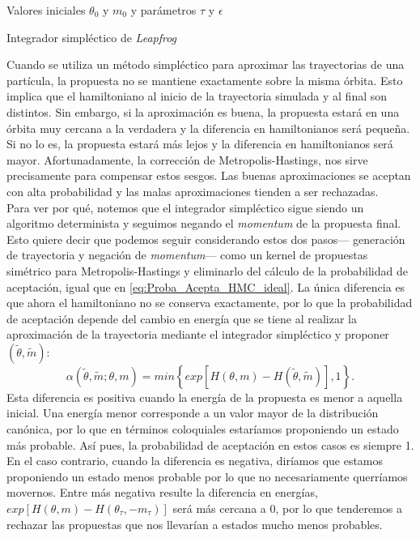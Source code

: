 \begin{algorithm}
\DontPrintSemicolon
Valores iniciales $\theta_0$ y $m_0$ y parámetros $\tau$ y $\epsilon$\;

\caption{Integrador simpléctico de \textit{Leapfrog} \label{alg:Leapfrog}}
\end{algorithm}

Cuando se utiliza un método simpléctico para aproximar las trayectorias de una partícula, la propuesta no se mantiene exactamente sobre la misma órbita. Esto implica que el hamiltoniano al inicio de la trayectoria simulada y al final son distintos. Sin embargo, si la aproximación es buena, la propuesta estará en una órbita muy cercana a la verdadera y la diferencia en hamiltonianos será pequeña. Si no lo es, la propuesta estará más lejos y la diferencia en hamiltonianos será mayor. Afortunadamente, la corrección de Metropolis-Hastings, nos sirve precisamente para compensar estos sesgos. Las buenas aproximaciones se aceptan con alta probabilidad y las malas aproximaciones tienden a ser rechazadas.\\

Para ver por qué, notemos que el integrador simpléctico sigue siendo un algoritmo determinista y seguimos negando el \textit{momentum} de la propuesta final. Esto quiere decir que podemos seguir considerando estos dos pasos--- generación de trayectoria y negación de \textit{momentum}--- como un kernel de propuestas simétrico para Metropolis-Hastings y eliminarlo del cálculo de la probabilidad de aceptación, igual que en \eqref{eq:Proba_Acepta_HMC_ideal}. La única diferencia es que ahora el hamiltoniano no se conserva exactamente, por lo que la probabilidad de aceptación depende del cambio en energía que se tiene al realizar la aproximación de la trayectoria mediante el integrador simpléctico y proponer $(\tilde{\theta},\tilde{m})$:
\begin{equation}
\alpha(\tilde{\theta},\tilde{m};\theta,m) = min\left\lbrace exp\left[ H(\theta,m)-H(\tilde{\theta},\tilde{m})\right],1\right\rbrace.
\label{eq:Proba_Acepta_HMC}
\end{equation}
Esta diferencia es positiva cuando la energía de la propuesta es menor a aquella inicial. Una energía menor corresponde a un valor mayor de la distribución canónica, por lo que en términos coloquiales estaríamos proponiendo un estado más probable. Así pues, la probabilidad de aceptación en estos casos es siempre 1. En el caso contrario, cuando la diferencia es negativa, diríamos que estamos proponiendo un estado menos probable por lo que no necesariamente querríamos movernos. Entre más negativa resulte la diferencia en energías, $exp\left[ H(\theta,m)-H(\theta_\tau,-m_\tau)\right]$ será más cercana a $0$, por lo que tenderemos a rechazar las propuestas que nos llevarían a estados mucho menos probables.\\

